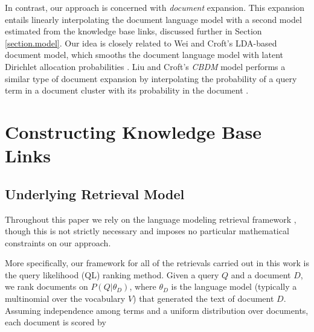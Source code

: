 \documentclass{sig-alternate}
\begin{document}

In contrast, our approach is concerned with \textit{document} expansion. This expansion entails linearly interpolating the document language model with a second model estimated from the knowledge base links, discussed further in Section \ref{section.model}. Our idea is closely related to Wei and Croft's LDA-based document model, which smooths the document language model with latent Dirichlet allocation probabilities \cite{Wei2006}. Liu and Croft's \textit{CBDM} model performs a similar type of document expansion by interpolating the probability of a query term in a document cluster with its probability in the document \cite{Liu2004}.

\section{Constructing Knowledge Base Links}\label{section.linking}

\subsection{Underlying Retrieval Model}\label{section.linking.model}
Throughout this paper we rely on the language modeling retrieval framework \cite{Lafferty2001}, though this is not strictly necessary and imposes no particular mathematical constraints on our approach.

More specifically, our framework for all of the retrievals carried out in this work is the query likelihood (QL) ranking method.  Given a query $Q$ and a document $D$, we rank documents on $P(Q | \theta_D)$, where $\theta_D$ is the language model (typically a multinomial over the vocabulary $V$) that generated the text of document $D$.  Assuming independence among terms and a uniform distribution over documents, each document is scored by
\end{document}
